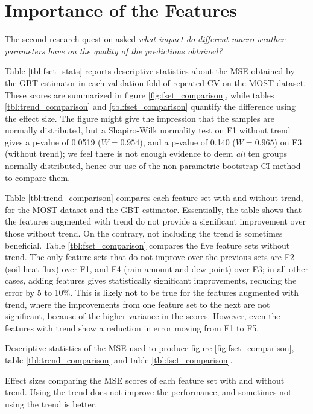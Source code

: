 \documentclass[a4paper,11pt]{kth-mag}
\begin{document}
\section{Importance of the Features}
\label{sec:feat_imps}
The second research question asked \emph{what impact do different macro-weather parameters have on the quality of the predictions obtained?}

Table \ref{tbl:fset_stats} reports descriptive statistics about the MSE obtained by the GBT estimator in each validation fold of repeated CV on the MOST dataset. These scores are summarized in figure \ref{fig:fset_comparison}, while tables \ref{tbl:trend_comparison} and \ref{tbl:fset_comparison} quantify the difference using the effect size. The figure might give the impression that the samples are normally distributed, but a Shapiro-Wilk normality test on F1 without trend gives a p-value of 0.0519 ($W=0.954$), and a p-value of 0.140 ($W=0.965$) on F3 (without trend); we feel there is not enough evidence to deem \emph{all} ten groups normally distributed, hence our use of the non-parametric bootstrap CI method to compare them.

Table \ref{tbl:trend_comparison} compares each feature set with and without trend, for the MOST dataset and the GBT estimator. Essentially, the table shows that the features augmented with trend do not provide a significant improvement over those without trend. On the contrary, not including the trend is sometimes beneficial. Table \ref{tbl:fset_comparison} compares the five feature sets without trend. The only feature sets that do not improve over the previous sets are F2 (soil heat flux) over F1, and F4 (rain amount and dew point) over F3; in all other cases, adding features gives statistically significant improvements, reducing the error by 5 to 10\%. This is likely not to be true for the features augmented with trend, where the improvements from one feature set to the next are not significant, because of the higher variance in the scores. However, even the features with trend show a reduction in error moving from F1 to F5.


\begin{table}
\caption{Descriptive statistics of the MSE used to produce figure \ref{fig:fset_comparison}, table \ref{tbl:trend_comparison} and table \ref{tbl:fset_comparison}.}
\label{tbl:fset_stats}

\end{table}


\begin{table}
\caption{Effect sizes comparing the MSE scores of each feature set with and without trend. Using the trend does not improve the performance, and sometimes not using the trend is better.}
\label{tbl:trend_comparison}

\end{table}
\end{document}
